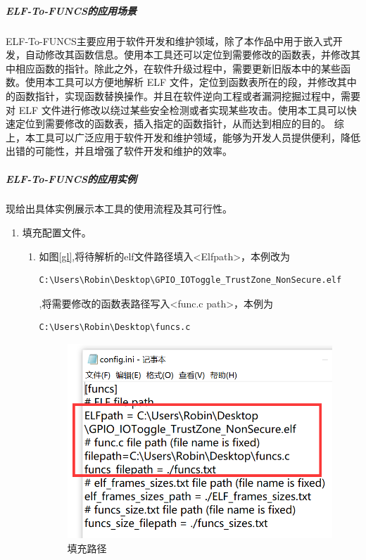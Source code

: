 \documentclass[UTF8,12pt,a4paper,twoside]{ctexart}
\numberwithin{figure}{section}
\begin{document}
\subparagraph{ELF-To-FUNCS的应用场景}
\par ELF-To-FUNCS主要应用于软件开发和维护领域，除了本作品中用于嵌入式开发，自动修改其函数信息。使用本工具还可以定位到需要修改的函数表，并修改其中相应函数的指针。除此之外，在软件升级过程中，需要更新旧版本中的某些函数。使用本工具可以方便地解析 ELF 文件，定位到函数表所在的段，并修改其中的函数指针，实现函数替换操作。并且在软件逆向工程或者漏洞挖掘过程中，需要对 ELF 文件进行修改以绕过某些安全检测或者实现某些攻击。使用本工具可以快速定位到需要修改的函数表，插入指定的函数指针，从而达到相应的目的。
综上，本工具可以广泛应用于软件开发和维护领域，能够为开发人员提供便利，降低出错的可能性，并且增强了软件开发和维护的效率。
\subparagraph{ELF-To-FUNCS的应用实例}
\par 现给出具体实例展示本工具的使用流程及其可行性。
\begin{enumerate}
    \item 填充配置文件。
          \begin{enumerate}
              \item 如图\ref{gl},将待解析的elf文件路径填入<Elfpath>，本例改为\begin{verbatim}C:\Users\Robin\Desktop\GPIO_IOToggle_TrustZone_NonSecure.elf\end{verbatim},将需要修改的函数表路径写入<func.c path>，本例为\begin{verbatim}C:\Users\Robin\Desktop\funcs.c\end{verbatim}
                    \begin{figure}
                        \centering
                        \includegraphics[scale=0.4]{graph/gailujing.png}
                        \caption{填充路径}

\end{figure}
\end{enumerate}
\end{enumerate}
\end{document}
